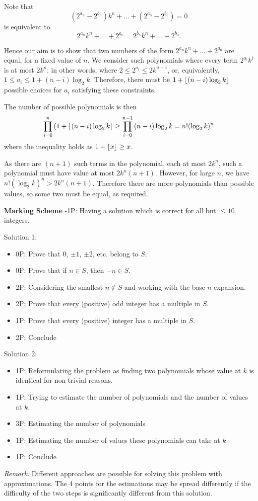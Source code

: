Note that 
\[
    (2^{a_n}-2^{b_n})k^n + \ldots + (2^{a_0} - 2^{b_0}) = 0
\]
is equivalent to
\[
    2^{a_n}k^n + \ldots + 2^{a_0} = 2^{b_n}k^n + \ldots + 2^{b_0}.
\]

Hence our aim is to show that two numbers of the form $2^{a_n}k^n + \ldots + 2^{a_0}$ are equal, for a fixed value of $n$. We consider such polynomials where every term $2^{a_i}k^i$ is at most $2k^n$; in other words, where $2\leq 2^{a_i} \leq 2k^{n-i}$, or, equivalently, $1\leq a_i \leq 1+(n-i)\log_2k$. Therefore, there must be $1+\lfloor(n-i)\log_2k\rfloor$ possible choices for $a_i$ satisfying these constraints.

The number of possible polynomials is then
\[
    \prod_{i=0}^n{(1+\lfloor(n-i)\log_2k\rfloor} \geq \prod_{i=0}^{n-1}{(n-i)\log_2k} = n!(\log_2k)^n
\]
where the inequality holds as $1+\lfloor x\rfloor \geq x$.

As there are $(n+1)$ such terms in the polynomial, each at most $2k^n$, such a polynomial must have value at most $2k^n(n+1)$. However, for large $n$, we have $n!(\log_2k)^n > 2k^n(n+1)$. Therefore there are more polynomials than possible values, so some two must be equal, as required.

\newpage

\textbf{Marking Scheme}
-1P: Having a solution which is correct for all but $\leq 10$ integers.

 Solution 1:
\begin{itemize}
    \item 0P: Prove that $0$, $\pm 1$, $\pm 2$, etc. belong to $S$.
    \item 0P: Prove that if $n\in S$, then $-n \in S$.
    \item 2P: Considering the smallest $n\notin S$ and working with the base-$n$ expansion.
    \item 2P: Prove that every (positive) odd integer has a multiple in $S$.
    \item 1P: Prove that every (positive) integer has a multiple in $S$.
    \item 2P: Conclude
\end{itemize}

Solution 2:
\begin{itemize}
    \item 1P: Reformulating the problem as finding two polynomials whose value at $k$ is identical for non-trivial reasons.
    \item 1P: Trying to estimate the number of polynomials and the number of values at $k$.
    \item 3P: Estimating the number of polynomials
    \item 1P: Estimating the number of values these polynomials can take at $k$
    \item 1P: Conclude
\end{itemize}

\textit{Remark:} Different approaches are possible for solving this problem with approximations. The 4 points for the estimations may be spread differently if the difficulty of the two steps is significantly different from this solution.
